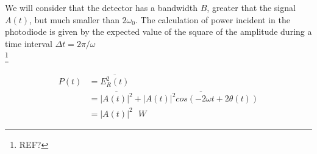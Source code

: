 \begin{bibunit}[plain]
We will consider that the detector has a bandwidth $B$, greater that the signal $A(t)$, but much smaller than $2 \omega_0$. The calculation of power incident in the photodiode is given by the expected value of the square of the amplitude during a time interval $\Delta t = 2 \pi / \omega$\\
\footnote{REF?}


\begin{align}
	P(t)	&= \overline{E_R^2(t)}\nonumber\\
			&= \overline{|A(t)|^2} + \overline{ |A(t)|^2 cos\left(-2 \omega t + 2\theta(t)\right)}\nonumber\\
         &= |A(t)|^2 \,\,\,\, W
\end{align}




\end{bibunit}
